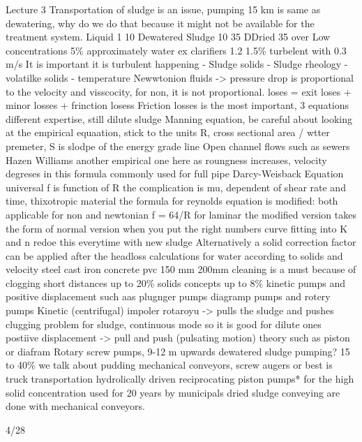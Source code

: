 \documentclass[12pt]{article}
\begin{document}
Lecture 3
Transportation of sludge is an issue, pumping 15 km is same as dewatering, why do we do that because it might not be available for the treatment system.
Liquid 1 10
Dewatered Sludge 10 35
DDried 35 over
Low concentrations 5\% approximately water
ex clarifiers 1.2 1.5\%
turbelent with 0.3 m/s
It is important it is turbulent happening
- Sludge solids
- Sludge rheology
- volatilke solids
- temperature
Newwtonion fluids -> pressure drop is proportional to the velocity and visscocity, for non, it is not proportional.
loses = exit loses + minor losses + frinction losess
Friction losses is the most important, 3 equations
different expertise, still dilute sludge
Manning equation, be careful about looking at the empirical equaation, stick to the units
R, cross sectional area / wtter premeter, S is slodpe of the energy grade line
Open channel flows
such as sewers
Hazen Williams
another empirical one
here as roungness increases, velocity degreses in this formula
commonly used for full pipe
Darcy-Weisback Equation
universal
f is function of R
the complication is mu, dependent of shear rate and time, thixotropic material
the formula for reynolds equation is modified:
both applicable for non and newtonian
f = 64/R for laminar
the modified version takes the form of normal version when you put the right numbers
curve fitting into K and n
redoe this everytime with new sludge
Alternatively a solid correction factor can be applied after the headloss calculations for water according to solids and velocity
steel
cast iron
concrete
pvc
150 mm 200mm
cleaning is a must because of clogging
short distances up to 20\%
solids concepts up to 8\%
kinetic pumps and positive displacement such aas plugnger pumps diagramp pumps and rotery pumps
Kinetic (centrifugal) impoler rotaroyu -> pulls the sludge and pushes
clugging problem for sludge, continuous mode so it is good for dilute ones
postiive displacement -> pull and push (pulsating motion) theory such as piston or diafram
Rotary screw pumps, 9-12 m upwards
dewatered sludge pumping?
15 to 40\% we talk about pudding
mechanical conveyors, screw augers or best is truck transportation
hydrolically driven reciprocating piston pumps* for the high solid concentration used for 20 years by municipals
dried sludge conveying are done with mechanical conveyors.


4/28
\end{document}
